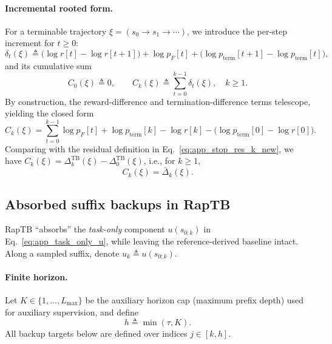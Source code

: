 \documentclass{article}
\theoremstyle{plain}
\theoremstyle{definition}
\theoremstyle{remark}
\begin{document}
\paragraph{Incremental rooted form.}
For a terminable trajectory $\xi=(s_0\!\to\!s_1\!\to\!\cdots)$, we introduce the per-step increment for $t\ge 0$:
\begin{equation}
\label{eq:app_delta_def_final}
\delta_t(\xi)
\triangleq
\big(\log r[t]-\log r[t{+}1]\big)
+\log p_F[t]
+\big(\log p_{\mathrm{term}}[t{+}1]-\log p_{\mathrm{term}}[t]\big),
\end{equation}
and its cumulative sum
\begin{equation}
\label{eq:app_Ck_def_final}
C_0(\xi)\triangleq 0,
\qquad
C_k(\xi)\triangleq \sum_{t=0}^{k-1}\delta_t(\xi),
\quad k\ge 1.
\end{equation}
By construction, the reward-difference and termination-difference terms telescope, yielding the closed form
\begin{equation}
\label{eq:app_Ck_closed_final}
C_k(\xi)
=
\sum_{t=0}^{k-1}\log p_F[t]
+\log p_{\mathrm{term}}[k]
-\log r[k]
-\Big(\log p_{\mathrm{term}}[0]-\log r[0]\Big).
\end{equation}
Comparing with the residual definition in Eq.~\eqref{eq:app_stop_res_k_new},
we have $C_k(\xi)=\Delta_k^{\mathrm{TB}}(\xi)-\Delta_0^{\mathrm{TB}}(\xi)$, i.e., for $k\ge 1$,
\begin{equation}
\label{eq:app_Ck_equals_rooted_final}
C_k(\xi)=\bar\Delta_k(\xi).
\end{equation}


\subsection{Absorbed suffix backups in RapTB}
\label{app:backup_details}

RapTB ``absorbs'' the \emph{task-only} component $u(s_{0:k})$ in Eq.~\eqref{eq:app_task_only_u},
while leaving the reference-derived baseline intact.
Along a sampled suffix, denote $u_k \triangleq u(s_{0:k})$.

\paragraph{Finite horizon.}
Let $K\in\{1,\dots,L_{\max}\}$ be the auxiliary horizon cap (maximum prefix depth) used for auxiliary supervision, and define
\begin{equation}
\label{eq:app_h_def}
h \triangleq \min(\tau, K).
\end{equation}
All backup targets below are defined over indices $j\in[k,h]$.
\end{document}
